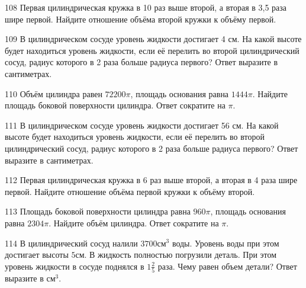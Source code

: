 \documentclass[4apaper]{article}
\begin{document}
\begin{taskBN}{108}
 Первая цилиндрическая кружка в 10 раз выше второй, а вторая в 3,5 раза шире первой. Найдите отношение объёма второй кружки к объёму первой.
\end{taskBN}

\begin{taskBN}{109}
В цилиндрическом сосуде уровень жидкости достигает 4 см. На какой высоте будет находиться уровень жидкости, если её перелить во второй цилиндрический сосуд, радиус которого в 2 раза больше радиуса первого? Ответ выразите в сантиметрах.
\end{taskBN}

\begin{taskBN}{110}
Объём цилиндра равен $72200\pi$, площадь основания равна $1444\pi$. Найдите площадь боковой поверхности цилиндра. Ответ сократите на $\pi$.
\end{taskBN}

\begin{taskBN}{111}
В цилиндрическом сосуде уровень жидкости достигает 56 см. На какой высоте будет находиться уровень жидкости, если её перелить во второй цилиндрический сосуд, радиус которого в 2 раза больше радиуса первого? Ответ выразите в сантиметрах.
\end{taskBN}

\begin{taskBN}{112}
 Первая цилиндрическая кружка в 6 раз выше второй, а вторая в 4 раза шире первой. Найдите отношение объёма первой кружки к объёму второй.
\end{taskBN}

\begin{taskBN}{113}
Площадь боковой поверхности цилиндра равна $960\pi$, площадь основания равна $2304\pi$. Найдите объём цилиндра. Ответ сократите на $\pi$.
\end{taskBN}

\begin{taskBN}{114}
В цилиндрический сосуд налили $3700\mbox{см}^3$ воды. Уровень воды при этом достигает высоты $5$см. В жидкость полностью погрузили деталь. При этом уровень жидкости в сосуде поднялся в ${1}\frac{2}{5}$ раза. Чему равен объем детали? Ответ выразите в $\mbox{см}^3$.
\end{taskBN}
\end{document}

